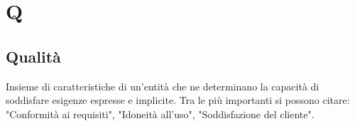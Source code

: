 \section*{Q}

\subsection{Qualità}
Insieme di caratteristiche di un'entità che ne determinano la capacità di soddisfare esigenze espresse e implicite. Tra le più importanti si possono citare: "Conformità ai requisiti", "Idoneità all'uso", "Soddisfazione del cliente".